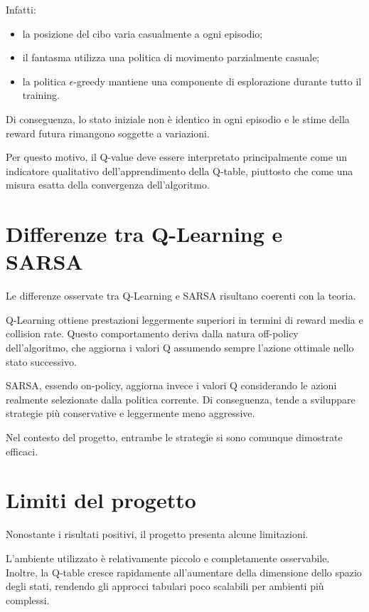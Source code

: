 \documentclass[12pt,a4paper]{report}
\begin{document}
Infatti:

\begin{itemize}
    \item la posizione del cibo varia casualmente a ogni episodio;
    \item il fantasma utilizza una politica di movimento parzialmente casuale;
    \item la politica $\epsilon$-greedy mantiene una componente di esplorazione durante tutto il training.
\end{itemize}

Di conseguenza, lo stato iniziale non è identico in ogni episodio e le stime della reward futura rimangono soggette a variazioni.

Per questo motivo, il Q-value deve essere interpretato principalmente come un indicatore qualitativo dell’apprendimento della Q-table, piuttosto che come una misura esatta della convergenza dell’algoritmo.

\section{Differenze tra Q-Learning e SARSA}

Le differenze osservate tra Q-Learning e SARSA risultano coerenti con la teoria.

Q-Learning ottiene prestazioni leggermente superiori in termini di reward media e collision rate. Questo comportamento deriva dalla natura off-policy dell’algoritmo, che aggiorna i valori Q assumendo sempre l’azione ottimale nello stato successivo.

SARSA, essendo on-policy, aggiorna invece i valori Q considerando le azioni realmente selezionate dalla politica corrente. Di conseguenza, tende a sviluppare strategie più conservative e leggermente meno aggressive.

Nel contesto del progetto, entrambe le strategie si sono comunque dimostrate efficaci.

\section{Limiti del progetto}

Nonostante i risultati positivi, il progetto presenta alcune limitazioni.

L’ambiente utilizzato è relativamente piccolo e completamente osservabile. Inoltre, la Q-table cresce rapidamente all’aumentare della dimensione dello spazio degli stati, rendendo gli approcci tabulari poco scalabili per ambienti più complessi.
\end{document}

